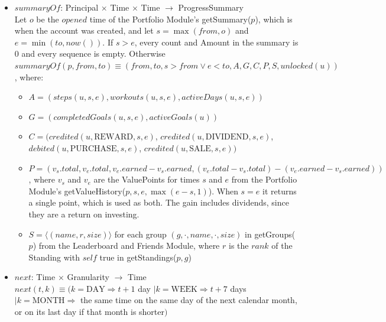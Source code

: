 \documentclass[12pt, titlepage]{article}
\begin{document}
\begin{itemize}
\item $\mathit{summaryOf}$: Principal $\times$ Time $\times$ Time
  $\rightarrow$ ProgressSummary\\
  Let $o$ be the $\mathit{opened}$ time of the Portfolio Module's
  getSummary($p$), which is when the account was created, and let $s =
  \max(\mathit{from}, o)$ and $e = \min(\mathit{to}, \mathit{now}())$. If $s
  > e$, every count and Amount in the summary is 0 and every sequence is
  empty. Otherwise $\mathit{summaryOf}(p, \mathit{from}, \mathit{to}) \equiv
  (\mathit{from}, \mathit{to}, s > \mathit{from} \vee e < \mathit{to},
  A, G, C, P, S, \mathit{unlocked}(u))$, where:
  \begin{itemize}
  \item $A = (\mathit{steps}(u, s, e), \mathit{workouts}(u, s, e),
    \mathit{activeDays}(u, s, e))$
  \item $G = (\mathit{completedGoals}(u, s, e), \mathit{activeGoals}(u))$
  \item $C = (\mathit{credited}(u, \mathrm{REWARD}, s, e)$,
    $\mathit{credited}(u, \mathrm{DIVIDEND}, s, e)$, $\mathit{debited}(u,
    \mathrm{PURCHASE}, s, e)$, $\mathit{credited}(u, \mathrm{SALE}, s, e))$
  \item $P = (v_s.\mathit{total}, v_e.\mathit{total}, v_e.\mathit{earned} -
    v_s.\mathit{earned}, (v_e.\mathit{total} - v_s.\mathit{total}) -
    (v_e.\mathit{earned} - v_s.\mathit{earned}))$, where $v_s$ and $v_e$ are
    the ValuePoints for times $s$ and $e$ from the Portfolio Module's
    getValueHistory($p, s, e, \max(e - s, 1)$). When $s = e$ it returns a
    single point, which is used as both. The gain includes dividends, since
    they are a return on investing.
  \item $S = \langle (\mathit{name}, r, \mathit{size}) \rangle$ for each
    group $(g, \cdot, \mathit{name}, \cdot, \mathit{size})$ in getGroups($p$)
    from the Leaderboard and Friends Module, where $r$ is the
    $\mathit{rank}$ of the Standing with $\mathit{self}$ true in
    getStandings($p, g$)
  \end{itemize}
\item $\mathit{next}$: Time $\times$ Granularity $\rightarrow$ Time\\
  $\mathit{next}(t, k) \equiv (k = \mathrm{DAY} \Rightarrow t + 1$ day
  $\mid k = \mathrm{WEEK} \Rightarrow t + 7$ days $\mid k = \mathrm{MONTH}
  \Rightarrow$ the same time on the same day of the next calendar month, or
  on its last day if that month is shorter$)$

\end{itemize}
\end{document}
